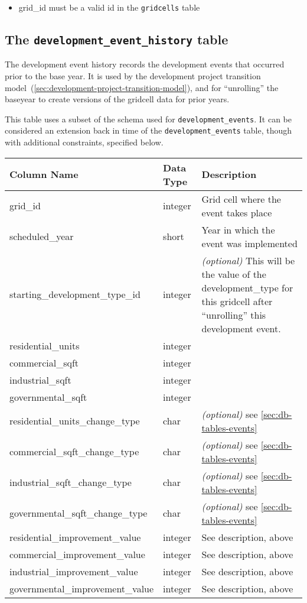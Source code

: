 \begin{itemize} \tight
\item grid_id must be a valid id in the \verb|gridcells| table
\end{itemize}


\subsection{The {\tt development_event_history} table}
\label{sec:table-development-event-history}

The development event history records the development events that occurred
prior to the base year. It is used by the development project transition model~(\ref{sec:development-project-transition-model}),
and for ``unrolling'' the baseyear to create versions of the gridcell data for
prior years.

This table uses a subset of the schema used for
\verb|development_events|.  It
can be considered an extension back in time of the \verb|development_events|
table, though with additional constraints, specified below.

\begin{tabular}{p{2in}lp{3.5in}}
\textbf{Column Name} & \textbf{Data Type} & \textbf{Description} \\
\hline
grid_id & integer & Grid cell where the event takes place  \\
\hline
scheduled_year &short & Year in which the event was implemented  \\
\hline
starting_development_type_id & integer & \emph{(optional) }
This will be the value of the development_type for this gridcell after
``unrolling'' this development event. \\
\hline
residential_units & integer & \\
\hline
commercial_sqft & integer & \\
\hline
industrial_sqft & integer & \\
\hline
governmental_sqft & integer & \\
\hline
residential_units_change_type & char & \emph{(optional) } see \ref{sec:db-tables-events}\\
\hline
commercial_sqft_change_type & char & \emph{(optional) } see \ref{sec:db-tables-events}\\
\hline
industrial_sqft_change_type & char & \emph{(optional) } see \ref{sec:db-tables-events}\\
\hline
governmental_sqft_change_type & char & \emph{(optional) } see \ref{sec:db-tables-events}\\
\hline
residential_improvement_value & integer & See description, above  \\
\hline
commercial_improvement_value & integer & See description, above  \\
\hline
industrial_improvement_value & integer & See description, above  \\
\hline
governmental_improvement_value & integer & See description, above  \\
\hline

\end{tabular}

